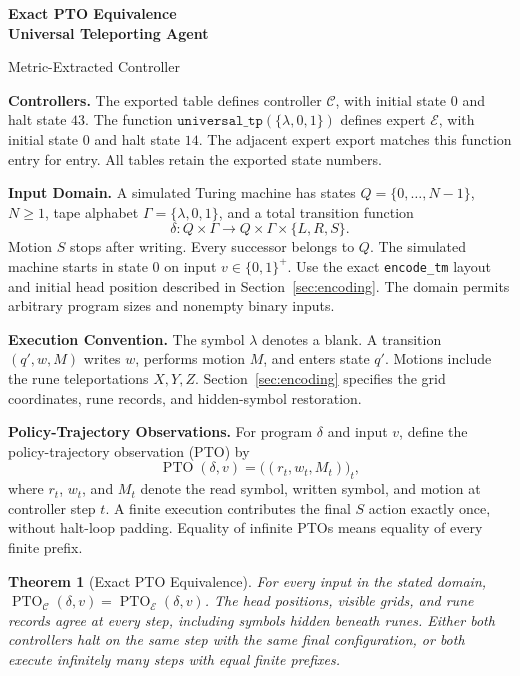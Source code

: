 \documentclass[11pt,a4paper]{article}
\date{}
\newcommand{\blank}{\lambda}
\newcommand{\EXPERT}{\mathcal E}
\newcommand{\CTRL}{\mathcal C}
\newcommand{\PTO}{\operatorname{PTO}}
\newcommand{\code}[1]{\texttt{#1}}
\newtheorem{theorem}{Theorem}
\newcommand{\sectiontitle}[2]{\refstepcounter{section}\vspace*{2pt}{\LARGE\bfseries\color{Teal}\thesection\quad #2}\par\vspace{7pt}}
\begin{document}
{\Huge\bfseries Exact PTO Equivalence\\[3pt]Universal Teleporting Agent}\par
\vspace{10pt}
{\Large Metric-Extracted Controller}\par
{\small\color{Muted}}\par
\vspace{7pt}

\vspace{4pt}
\sectiontitle{1 \enspace STATEMENT AND SCOPE}{Statement and Scope}\label{sec:common1}
\textbf{Controllers.}
The exported table  defines controller
$\CTRL$, with initial state $0$ and halt state $43$.
The function $\code{universal\_tp}(\{\blank,0,1\})$ defines expert
$\EXPERT$, with initial state $0$ and halt state $14$.
The adjacent expert export matches this function entry for entry.
All tables retain the exported state numbers.

\textbf{Input Domain.}
A simulated Turing machine has states $Q=\{0,\ldots,N-1\}$, $N\ge1$,
tape alphabet $\Gamma=\{\blank,0,1\}$, and a total transition function
\[
\delta:Q\times\Gamma\longrightarrow Q\times\Gamma\times\{L,R,S\}.
\]
Motion $S$ stops after writing. Every successor belongs to $Q$.
The simulated machine starts in state $0$ on input $v\in\{0,1\}^{+}$.
Use the exact \code{encode\_tm} layout and initial head position described
in Section~\ref{sec:encoding}. The domain permits arbitrary program sizes
and nonempty binary inputs.

\textbf{Execution Convention.}
The symbol $\blank$ denotes a blank. A transition $(q',w,M)$ writes $w$,
performs motion $M$, and enters state $q'$. Motions include the rune
teleportations $X,Y,Z$. Section~\ref{sec:encoding} specifies the grid
coordinates, rune records, and hidden-symbol restoration.

\textbf{Policy-Trajectory Observations.}
For program $\delta$ and input $v$, define the policy-trajectory observation
(PTO) by
\[
\PTO(\delta,v)=\bigl((r_t,w_t,M_t)\bigr)_t,
\]
where $r_t$, $w_t$, and $M_t$ denote the read symbol, written symbol,
and motion at controller step $t$. A finite execution contributes the final
$S$ action exactly once, without halt-loop padding. Equality of infinite
PTOs means equality of every finite prefix.

\begin{theorem}[Exact PTO Equivalence]\label{thm:main}
For every input in the stated domain,
$\PTO_{\CTRL}(\delta,v)=\PTO_{\EXPERT}(\delta,v)$.
The head positions, visible grids, and rune records agree at every step,
including symbols hidden beneath runes. Either both controllers halt on
the same step with the same final configuration, or both execute infinitely
many steps with equal finite prefixes.
\end{theorem}
\end{document}
